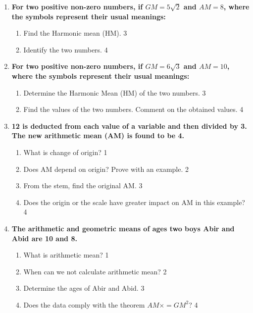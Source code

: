 \documentclass[a4paper,oneside]{book}
\begin{document}
\begin{enumerate}
  \item
\textbf{For two positive non-zero numbers, if $GM = 5\sqrt{2}$ and $AM = 8$, where the symbols represent their usual meanings:}

\begin{enumerate}
    \item  
    Find the Harmonic mean (HM). \hfill 3
    \item
    Identify the two numbers. \hfill 4
\end{enumerate}

\item
\textbf{For two positive non-zero numbers, if $GM = 6\sqrt{3}$ and $AM = 10$, where the symbols represent their usual meanings:}

\begin{enumerate}
    \item  
    Determine the Harmonic Mean (HM) of the two numbers. \hfill 3
    \item
    Find the values of the two numbers. Comment on the obtained values. \hfill 4
\end{enumerate}

  
   \item
	  \textbf{12 is deducted from each value of a variable and then divided by 3. The new arithmetic mean (AM) is found to be 4.} 
  
  \begin{enumerate}
    \item
	What is change of origin? \hfill 1
    \item
	Does AM depend on origin? Prove with an example. \hfill 2
    \item  
	From the stem, find the original AM. \hfill 3
    \item
	Does the origin or the scale have greater impact on AM in this example? \hfill 4
  \end{enumerate}

   \item
	  \textbf{The arithmetic and geometric means of ages two boys Abir and Abid are 10 and 8.} 
  
  \begin{enumerate}
    \item
	What is arithmetic mean? \hfill 1
    \item
	When can we not calculate arithmetic mean? \hfill 2
    \item  
	Determine the ages of Abir and Abid. \hfill 3
    \item
	Does the data comply with the theorem $\displaystyle AM \times  = GM^2$? \hfill 4
  \end{enumerate}
  

\end{enumerate}
\end{document}
